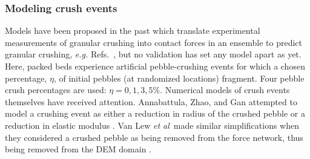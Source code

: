 \begin{table}[ht]
\centering
\caption{Transport properties of helium and boundary conditions in the CFD domain; mean values over the temperature range \SIrange{400}{900}{\celsius}.}
\label{tab:fluid-props}
\end{table}



\subsubsection{Modeling crush events}
Models have been proposed in the past which translate experimental measurements of granular crushing into contact forces in an ensemble to predict granular crushing, \textit{e.g.} Refs.~\cite{Gan:2010kc,Russell2009,Zhao2012,VanLew2015,Annabattula2014}, but no validation has set any model apart as yet. Here, packed beds experience artificial pebble-crushing events for which a chosen percentage, $\eta$, of initial pebbles (at randomized locations) fragment. Four pebble crush percentages are used: $\eta = 0, 1, 3, 5\%$. Numerical models of crush events themselves have received attention. Annabattula, Zhao, and Gan attempted to model a crushing event as either a reduction in radius of the crushed pebble or a reduction in elastic modulus \cite{Annabattula2011,Zhao2013,Annabattula2012a}. Van Lew \textit{et al}~made similar simplifications when they considered a crushed pebble as being removed from the force network, thus being removed from the DEM domain \cite{VanLew2014}. 

